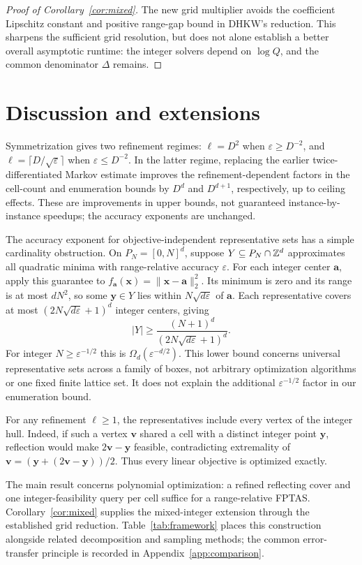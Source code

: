 \documentclass[11pt]{article}
\theoremstyle{definition}\newtheorem{definition}{Definition}[section]
\theoremstyle{remark}\newtheorem{remark}[theorem]{Remark}
\newcommand{\eps}{\varepsilon}
\begin{document}
\begin{proof}[Proof of Corollary~\ref{cor:mixed}]
The new grid multiplier avoids the coefficient Lipschitz constant and positive range-gap bound in DHKW's reduction. This sharpens the sufficient grid resolution, but does not alone establish a better overall asymptotic runtime: the integer solvers depend on $\log Q$, and the common denominator $\Delta$ remains.
\end{proof}

\section{Discussion and extensions}\label{sec:conclusion}
Symmetrization gives two refinement regimes: $\ell=D^2$ when $\eps\ge D^{-2}$, and $\ell=\lceil D/\sqrt\eps\rceil$ when $\eps\le D^{-2}$. In the latter regime, replacing the earlier twice-differentiated Markov estimate improves the refinement-dependent factors in the cell-count and enumeration bounds by $D^d$ and $D^{d+1}$, respectively, up to ceiling effects. These are improvements in upper bounds, not guaranteed instance-by-instance speedups; the accuracy exponents are unchanged.

The accuracy exponent for objective-independent representative sets has a simple cardinality obstruction. On $P_N=[0,N]^d$, suppose $Y\subseteq P_N\cap\mathbb Z^d$ approximates all quadratic minima with range-relative accuracy $\eps$. For each integer center $\mathbf a$, apply this guarantee to $f_{\mathbf a}(\mathbf x)=\|\mathbf x-\mathbf a\|_2^2$. Its minimum is zero and its range is at most $dN^2$, so some $\mathbf y\in Y$ lies within $N\sqrt{d\eps}$ of $\mathbf a$. Each representative covers at most $(2N\sqrt{d\eps}+1)^d$ integer centers, giving
\[
 |Y|\ge\frac{(N+1)^d}{(2N\sqrt{d\eps}+1)^d}.
\]
For integer $N\ge\eps^{-1/2}$ this is $\Omega_d(\eps^{-d/2})$. This lower bound concerns universal representative sets across a family of boxes, not arbitrary optimization algorithms or one fixed finite lattice set. It does not explain the additional $\eps^{-1/2}$ factor in our enumeration bound.

For any refinement $\ell\ge1$, the representatives include every vertex of the integer hull. Indeed, if such a vertex $\mathbf v$ shared a cell with a distinct integer point $\mathbf y$, reflection would make $2\mathbf v-\mathbf y$ feasible, contradicting extremality of $\mathbf v=(\mathbf y+(2\mathbf v-\mathbf y))/2$. Thus every linear objective is optimized exactly.

The main result concerns polynomial optimization: a refined reflecting cover and one integer-feasibility query per cell suffice for a range-relative FPTAS. Corollary~\ref{cor:mixed} supplies the mixed-integer extension through the established grid reduction. Table~\ref{tab:framework} places this construction alongside related decomposition and sampling methods; the common error-transfer principle is recorded in Appendix~\ref{app:comparison}.
\end{document}
